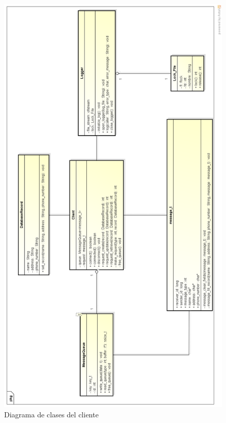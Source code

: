 \documentclass[11pt,spanish,a4paper,openany,notitlepage]{article}
\begin{document}
\begin{figure}[H]
\begin{center}
\includegraphics[width=360pt]{clases_cliente.png}
\caption{Diagrama de clases del cliente}
\end{center}
\end{figure}

\newpage
\end{document}
